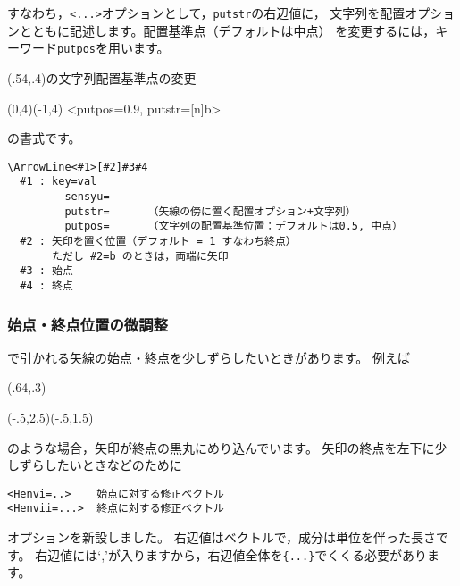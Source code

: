 すなわち，\verb+<...>+オプションとして，\verb+putstr+の右辺値に，
文字列を配置オプションとともに記述します。配置基準点（デフォルトは中点）
を変更するには，キーワード\verb+putpos+を用います。

\begin{showEx}(.54,.4){の文字列配置基準点の変更}
  \begin{zahyou*}[ul=10mm](0,4)(-1,4)
    \Drawline{\B\C\D\A}
    {\thicklines
    \ArrowLine<putpos=0.9,
      putstr=[n]{\beku b}>
        \A\B}
  \end{zahyou*}
\end{showEx}

の書式です。

\begin{boxnote}
\begin{verbatim}
\ArrowLine<#1>[#2]#3#4
  #1 : key=val
         sensyu=
         putstr=      （矢線の傍に置く配置オプション+文字列）
         putpos=      （文字列の配置基準位置：デフォルトは0.5, 中点）
  #2 : 矢印を置く位置（デフォルト = 1 すなわち終点）
       ただし #2=b のときは，両端に矢印
  #3 : 始点
  #4 : 終点
\end{verbatim}
\end{boxnote}

\subsubsection{始点・終点位置の微調整}
で引かれる矢線の始点・終点を少しずらしたいときがあります。
例えば

\begin{showEx}(.64,.3){}
\begin{zahyou*}[ul=10mm](-.5,2.5)(-.5,1.5)
  \Kuromaru\B
  \ArrowLine\A\B
\end{zahyou*}
\end{showEx}

\noindent
のような場合，矢印が終点の黒丸にめり込んでいます。
矢印の終点を左下に少しずらしたいときなどのために
\begin{jquote}
\begin{verbatim}
<Henvi=..>    始点に対する修正ベクトル
<Henvii=...>  終点に対する修正ベクトル
\end{verbatim}
\end{jquote}
オプションを新設しました。
右辺値はベクトルで，成分は単位を伴った長さです。
右辺値には`,'が入りますから，右辺値全体を\verb+{...}+でくくる必要があります。

